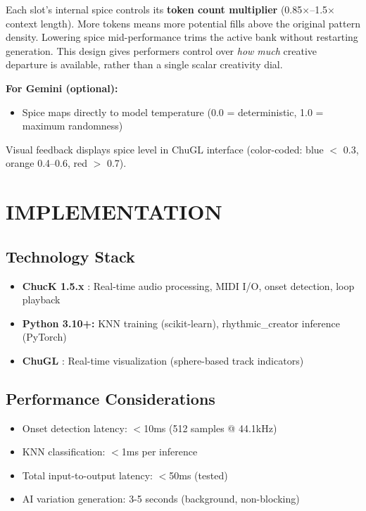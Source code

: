 \documentclass{aimc2026}
\begin{document}
Each slot's internal spice controls its \textbf{token count multiplier} (0.85$\times$--1.5$\times$ context length). More tokens means more potential fills above the original pattern density. Lowering spice mid-performance trims the active bank without restarting generation. This design gives performers control over \emph{how much} creative departure is available, rather than a single scalar creativity dial.

\textbf{For Gemini (optional):}
\begin{itemize}
\item Spice maps directly to model temperature (0.0 = deterministic, 1.0 = maximum randomness)
\end{itemize}

Visual feedback displays spice level in ChuGL interface (color-coded: blue $<$ 0.3, orange 0.4--0.6, red $>$ 0.7).


\section{IMPLEMENTATION}
\label{sec:implementation}

\subsection{Technology Stack}

\begin{itemize}
\item \textbf{ChucK 1.5.x} \citep{wang2015chuck}: Real-time audio processing, MIDI I/O, onset detection, loop playback
\item \textbf{Python 3.10+:} KNN training (scikit-learn), rhythmic\_creator inference (PyTorch)
\item \textbf{ChuGL} \citep{aday2024chugl}: Real-time visualization (sphere-based track indicators)
\end{itemize}

\subsection{Performance Considerations}

\begin{itemize}
\item Onset detection latency: $<$10ms (512 samples @ 44.1kHz)
\item KNN classification: $<$1ms per inference
\item Total input-to-output latency: $<$50ms (tested)
\item AI variation generation: 3-5 seconds (background, non-blocking)
\end{itemize}
\end{document}
